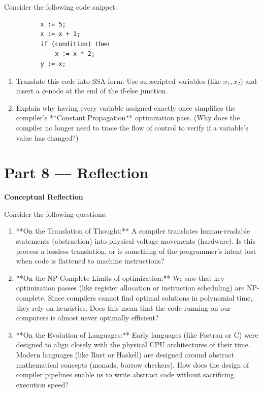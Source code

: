 \documentclass[12pt, a4paper]{book}
\begin{document}
\begin{deepbox}
\begin{enumerate}[label=\textbf{D\arabic*.}]
        Consider the following code snippet:
        \begin{verbatim}
          x := 5;
          x := x + 1;
          if (condition) then
              x := x * 2;
          y := x;
        \end{verbatim}
        
        \begin{enumerate}[label=(\alph*)]
          \item Translate this code into SSA form. Use subscripted variables (like $x_1, x_2$) and insert a $\phi$-node at the end of the if-else junction.
          \item Explain why having every variable assigned exactly once simplifies the compiler's **Constant Propagation** optimization pass.
                (Why does the compiler no longer need to trace the flow of control to verify if a variable's value has changed?)
        \end{enumerate}
\end{enumerate}
\end{deepbox}

\newpage

\section{Part 8 --- Reflection}

\begin{reflectionbox}
\textbf{Conceptual Reflection}

Consider the following questions:
\begin{enumerate}
  \item **On the Translation of Thought:** A compiler translates human-readable statements (abstraction) into physical voltage movements (hardware). Is this process a lossless translation, or is something of the programmer's intent lost when code is flattened to machine instructions?
  \item **On the NP-Complete Limits of optimization:** We saw that key optimization passes (like register allocation or instruction scheduling) are NP-complete. Since compilers cannot find optimal solutions in polynomial time, they rely on heuristics. Does this mean that the code running on our computers is almost never optimally efficient?
  \item **On the Evolution of Languages:** Early languages (like Fortran or C) were designed to align closely with the physical CPU architectures of their time. Modern languages (like Rust or Haskell) are designed around abstract mathematical concepts (monads, borrow checkers). How does the design of compiler pipelines enable us to write abstract code without sacrificing execution speed?
\end{enumerate}
\end{reflectionbox}
\end{document}
